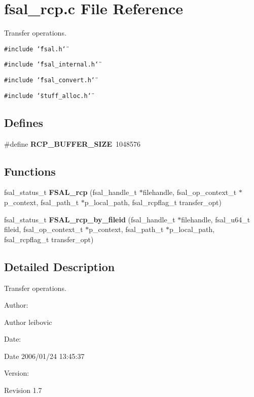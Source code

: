 \section{fsal\_\-rcp.c File Reference}
\label{fsal__rcp_8c}
Transfer operations. 

{\tt \#include \char`\"{}fsal.h\char`\"{}}\par
{\tt \#include \char`\"{}fsal\_\-internal.h\char`\"{}}\par
{\tt \#include \char`\"{}fsal\_\-convert.h\char`\"{}}\par
{\tt \#include \char`\"{}stuff\_\-alloc.h\char`\"{}}\par
\subsection*{Defines}
\begin{CompactItemize}
\item 
\#define {\bf RCP\_\-BUFFER\_\-SIZE}\ 1048576\label{fsal__rcp_8c_a0}

\end{CompactItemize}
\subsection*{Functions}
\begin{CompactItemize}
\item 
fsal\_\-status\_\-t {\bf FSAL\_\-rcp} (fsal\_\-handle\_\-t $\ast$filehandle, fsal\_\-op\_\-context\_\-t $\ast$p\_\-context, fsal\_\-path\_\-t $\ast$p\_\-local\_\-path, fsal\_\-rcpflag\_\-t transfer\_\-opt)
\item 
fsal\_\-status\_\-t {\bf FSAL\_\-rcp\_\-by\_\-fileid} (fsal\_\-handle\_\-t $\ast$filehandle, fsal\_\-u64\_\-t fileid, fsal\_\-op\_\-context\_\-t $\ast$p\_\-context, fsal\_\-path\_\-t $\ast$p\_\-local\_\-path, fsal\_\-rcpflag\_\-t transfer\_\-opt)\label{fsal__rcp_8c_a2}

\end{CompactItemize}


\subsection{Detailed Description}
Transfer operations. 

\begin{Desc}
\item[Author:]\begin{Desc}
\item[Author]leibovic \end{Desc}
\end{Desc}
\begin{Desc}
\item[Date:]\begin{Desc}
\item[Date]2006/01/24 13:45:37 \end{Desc}
\end{Desc}
\begin{Desc}
\item[Version:]\begin{Desc}
\item[Revision]1.7 \end{Desc}
\end{Desc}


